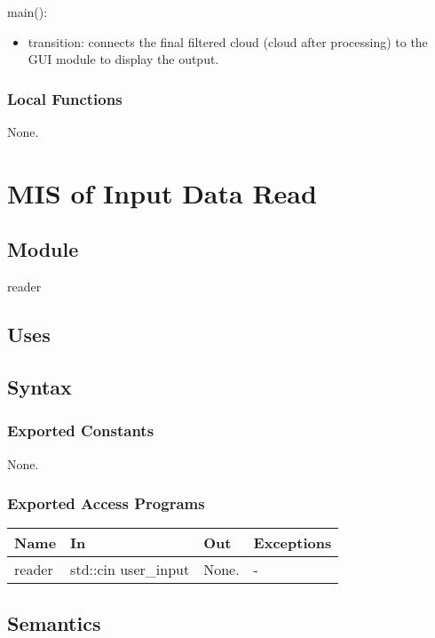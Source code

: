 \documentclass[12pt, titlepage]{article}
\begin{document}
\noindent main():
\begin{itemize}
\item transition: connects the final filtered cloud (cloud after processing) to the GUI module to display the output.
\end{itemize}


\subsubsection{Local Functions}

None.

\newpage

\section{MIS of Input Data Read} \label{ModuleIDR} 

\subsection{Module}
reader
\subsection{Uses}

\subsection{Syntax}

\subsubsection{Exported Constants}

None.

\subsubsection{Exported Access Programs}

\begin{center}
\begin{tabular}{p{2cm} p{4cm} p{4cm} p{2cm}}
\hline
\textbf{Name} & \textbf{In} & \textbf{Out} & \textbf{Exceptions} \\
\hline
reader & std::cin user\_input  & None. & - \\
\hline
\end{tabular}
\end{center}

\subsection{Semantics}
\end{document}
